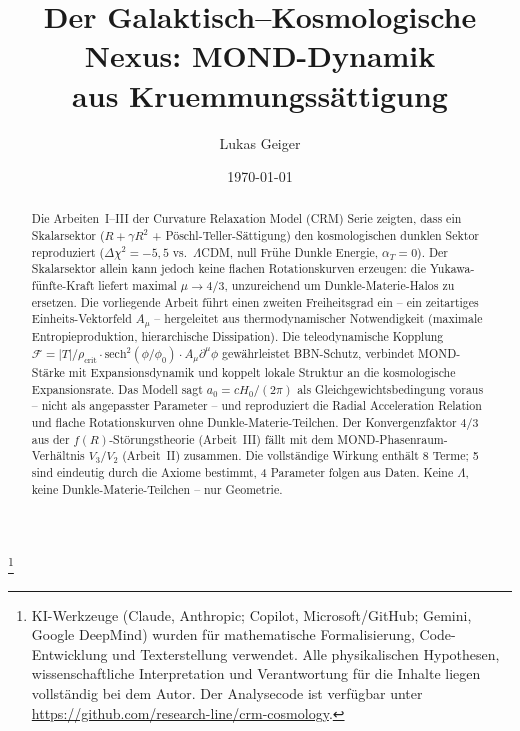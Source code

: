 \documentclass[aps,prd,twocolumn,superscriptaddress,nofootinbib]{revtex4-2}
\begin{document}

\title{Der Galaktisch--Kosmologische Nexus: MOND-Dynamik\\aus Kruemmungss\"attigung}

\author{Lukas Geiger}

\date{\today}

\begin{abstract}
Die Arbeiten~I--III der Curvature Relaxation Model (CRM) Serie zeigten, dass ein Skalarsektor ($R + \gamma R^2$ + P\"oschl-Teller-S\"attigung) den kosmologischen dunklen Sektor reproduziert ($\Delta\chi^2 = -5{,}5$ vs.\ $\Lambda$CDM, null Fr\"uhe Dunkle Energie, $\alpha_T = 0$). Der Skalarsektor allein kann jedoch keine flachen Rotationskurven erzeugen: die Yukawa-f\"unfte-Kraft liefert maximal $\mu \to 4/3$, unzureichend um Dunkle-Materie-Halos zu ersetzen. Die vorliegende Arbeit f\"uhrt einen zweiten Freiheitsgrad ein -- ein zeitartiges Einheits-Vektorfeld $A_\mu$ -- hergeleitet aus thermodynamischer Notwendigkeit (maximale Entropieproduktion, hierarchische Dissipation). Die teleodynamische Kopplung $\mathcal{F} = |T|/\rho_{\mathrm{crit}} \cdot \mathrm{sech}^2(\phi/\phi_0) \cdot A_\mu\partial^\mu\phi$ gew\"ahrleistet BBN-Schutz, verbindet MOND-St\"arke mit Expansionsdynamik und koppelt lokale Struktur an die kosmologische Expansionsrate. Das Modell sagt $a_0 = cH_0/(2\pi)$ als Gleichgewichtsbedingung voraus -- nicht als angepasster Parameter -- und reproduziert die Radial Acceleration Relation und flache Rotationskurven ohne Dunkle-Materie-Teilchen. Der Konvergenzfaktor $4/3$ aus der $f(R)$-St\"orungstheorie (Arbeit~III) f\"allt mit dem MOND-Phasenraum-Verh\"altnis $V_3/V_2$ (Arbeit~II) zusammen. Die vollst\"andige Wirkung enth\"alt 8 Terme; 5 sind eindeutig durch die Axiome bestimmt, 4 Parameter folgen aus Daten. Keine $\Lambda$, keine Dunkle-Materie-Teilchen -- nur Geometrie.
\end{abstract}


\thanks{KI-Werkzeuge (Claude, Anthropic; Copilot, Microsoft/GitHub; Gemini, Google DeepMind) wurden für mathematische Formalisierung, Code-Entwicklung und Texterstellung verwendet. Alle physikalischen Hypothesen, wissenschaftliche Interpretation und Verantwortung für die Inhalte liegen vollständig bei dem Autor. Der Analysecode ist verfügbar unter \url{https://github.com/research-line/crm-cosmology}.}
\end{document}
